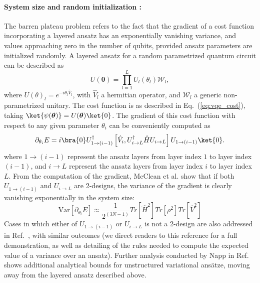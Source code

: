 \paragraph{System size and random initialization \cite{McClean2018}:} The barren plateau problem refers to the fact that the gradient of a cost function incorporating a layered ansatz has an exponentially vanishing variance, and values approaching zero in the number of qubits, provided ansatz parameters are initialized randomly. A layered ansatz for a random parametrized quantum circuit can be described as \cite{McClean2018}
\begin{equation} \label{eq:layered_ansatz}
    U(\boldsymbol{\theta}) = \prod_{l = 1}^L U_l(\theta_l) \mathcal{W}_l,
\end{equation}
where $U(\theta)_l = e^{-i\theta_l \hat{V}_l}$, with $\hat{V}_l$ a hermitian operator, and $\mathcal{W}_l$ a generic non-parametrized unitary. The cost function is as described in Eq.~(\ref{eq:vqe_cost}), taking $\ket{\psi(\boldsymbol{\theta})} = U(\boldsymbol{\theta}) \ket{0}$. The gradient of this cost function with respect to any given parameter $\theta_i$ can be conveniently computed as
\begin{equation} \label{eq:layered_ansatz_gradient}
    \partial_{\theta_i} E = i \bra{0} U^{\dagger}_{1 \rightarrow (i - 1)} \left[\hat{V}_i, U^{\dagger}_{i \rightarrow L} \hat{H} U_{i \rightarrow L}  \right] U_{1 \rightarrow (i - 1)} \ket{0}.
\end{equation}
where $1 \rightarrow (i - 1)$ represent the ansatz layers from layer index $1$ to layer index $(i - 1)$, and $i \rightarrow L$ represent the ansatz layers from layer index $i$ to layer index $L$. From the computation of the gradient, McClean et al. \cite{McClean2018} show that if both $U_{1 \rightarrow (i - 1)}$ and $U_{i \rightarrow L}$ are 2-designs, the variance of the gradient is clearly vanishing exponentially in the system size:
\begin{equation}
    \mathrm{Var}[\partial_{\theta_i} E] \approx \frac{1}{2^{(3N - 1)}} Tr\left[\hat{H}^2\right] Tr\left[\rho^2\right] Tr\left[\hat{V}^2\right] 
\end{equation}
Cases in which either of $U_{1 \rightarrow (i - 1)}$ or $U_{i \rightarrow L}$ is not a 2-design are also addressed in Ref.~\cite{McClean2018}, with similar outcomes (we direct readers to this reference for a full demonstration, as well as detailing of the rules needed to compute the expected value of a variance over an ansatz). Further analysis conducted by Napp in Ref. \cite{Napp2022} shows additional analytical bounds for unstructured variational ans{\"{a}}tze, moving away from the layered ansatz described above. 

